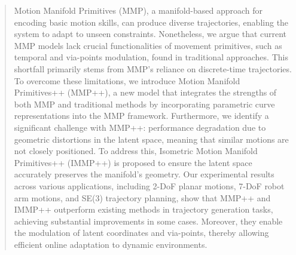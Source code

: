 \begin{abstract}
Motion Manifold Primitives (MMP), a manifold-based approach for encoding basic motion skills, can produce diverse trajectories, enabling the system to adapt to unseen constraints. Nonetheless, we argue that current MMP models lack crucial functionalities of movement primitives, such as temporal and via-points modulation, found in traditional approaches. This shortfall primarily stems from MMP's reliance on discrete-time trajectories.
To overcome these limitations, we introduce Motion Manifold Primitives++ (MMP++), a new model that integrates the strengths of both MMP and traditional methods by incorporating parametric curve representations into the MMP framework. Furthermore, we identify a significant challenge with MMP++: performance degradation due to geometric distortions in the latent space, meaning that similar motions are not closely positioned. To address this, Isometric Motion Manifold Primitives++ (IMMP++) is proposed to ensure the latent space accurately preserves the manifold's geometry.
Our experimental results across various applications, including 2-DoF planar motions, 7-DoF robot arm motions, and SE(3) trajectory planning, show that MMP++ and IMMP++ outperform existing methods in trajectory generation tasks, achieving substantial improvements in some cases. Moreover, they enable the modulation of latent coordinates and via-points, thereby allowing efficient online adaptation to dynamic environments.

\end{abstract} 